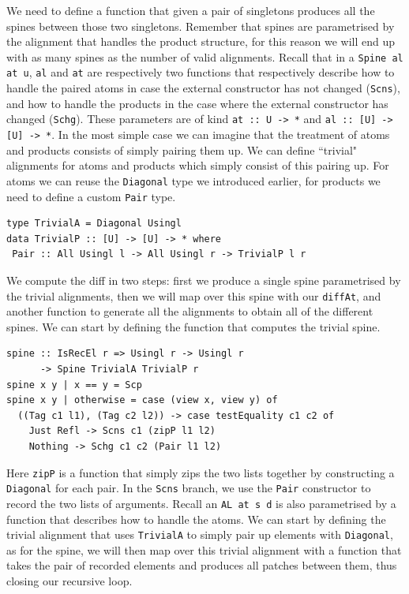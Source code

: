 \documentclass[11pt, titlepage]{article}
\newcommand{\toHaskell}[1]{\texttt{#1}\xspace}
\newcommand{\scns}{\toHaskell{Scns}}
\newcommand{\schg}{\toHaskell{Schg}}
\begin{document}
We need to define a function that given a pair of singletons produces all the spines between those two singletons. Remember that spines are parametrised by the alignment that handles the product structure, for this reason we will end up with as many spines as the number of valid alignments.
Recall that in a \toHaskell{Spine al at u}, \toHaskell{al} and \toHaskell{at} are respectively two functions that respectively describe how to handle the paired atoms in case the external constructor has not changed (\scns), and how to handle the products in the case where the external constructor has changed (\schg). These parameters are of kind \toHaskell{at :: U -> *} and \toHaskell{al :: [U] -> [U] -> *}. In the most simple case we can imagine that the treatment of atoms and products consists of simply pairing them up. We can define ``trivial" alignments for atoms and products which simply consist of this pairing up. For atoms we can reuse the \toHaskell{Diagonal} type we introduced earlier, for products we need to define a custom \toHaskell{Pair} type.

\begin{verbatim}
type TrivialA = Diagonal Usingl
data TrivialP :: [U] -> [U] -> * where
 Pair :: All Usingl l -> All Usingl r -> TrivialP l r
\end{verbatim}

We compute the diff in two steps: first we produce a single spine parametrised by the trivial alignments, then we will map over this spine with our \toHaskell{diffAt}, and another function to generate all the alignments to obtain all of the different spines.
We can start by defining the function that computes the trivial spine.
\begin{verbatim}
spine :: IsRecEl r => Usingl r -> Usingl r 
      -> Spine TrivialA TrivialP r
spine x y | x == y = Scp
spine x y | otherwise = case (view x, view y) of
  ((Tag c1 l1), (Tag c2 l2)) -> case testEquality c1 c2 of
    Just Refl -> Scns c1 (zipP l1 l2)
    Nothing -> Schg c1 c2 (Pair l1 l2)
\end{verbatim}

Here \toHaskell{zipP} is a function that simply zips the two lists together by constructing a \toHaskell{Diagonal} for each pair.
In the \scns branch, we use the \toHaskell{Pair} constructor to record the two lists of arguments.
Recall an \toHaskell{AL at s d} is also parametrised by a function that describes how to handle the atoms. We can start by defining the trivial alignment that uses \toHaskell{TrivialA} to simply pair up elements with \toHaskell{Diagonal}, as for the spine, we will then map over this trivial alignment with a function that takes the pair of recorded elements and produces all patches between them, thus closing our recursive loop.
\end{document}
